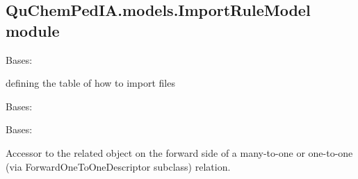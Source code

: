 \documentclass[letterpaper,10pt,english]{sphinxmanual}
\begin{document}
\subsection{QuChemPedIA.models.ImportRuleModel module}
\label{\detokenize{QuChemPedIA.models:module-QuChemPedIA.models.ImportRuleModel}}\label{\detokenize{QuChemPedIA.models:quchempedia-models-importrulemodel-module}}

\begin{fulllineitems}
\label{\detokenize{QuChemPedIA.models:QuChemPedIA.models.ImportRuleModel.ImportRule}}
Bases: 

defining the table of how to import files

\begin{fulllineitems}
\label{\detokenize{QuChemPedIA.models:QuChemPedIA.models.ImportRuleModel.ImportRule.DoesNotExist}}
Bases: 

\end{fulllineitems}


\begin{fulllineitems}
\label{\detokenize{QuChemPedIA.models:QuChemPedIA.models.ImportRuleModel.ImportRule.MultipleObjectsReturned}}
Bases: 

\end{fulllineitems}


\begin{fulllineitems}
\label{\detokenize{QuChemPedIA.models:QuChemPedIA.models.ImportRuleModel.ImportRule.id_job_type}}
Accessor to the related object on the forward side of a many-to-one or
one-to-one (via ForwardOneToOneDescriptor subclass) relation.


\end{fulllineitems}
\end{fulllineitems}
\end{document}

